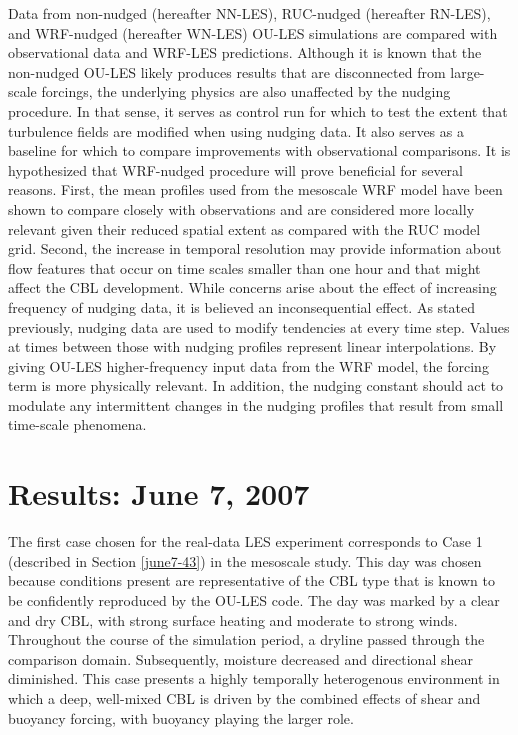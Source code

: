 Data from non-nudged (hereafter NN-LES), RUC-nudged (hereafter RN-LES), and WRF-nudged (hereafter WN-LES) OU-LES simulations are compared with observational data and WRF-LES predictions. Although it is known that the non-nudged OU-LES likely produces results that are disconnected from large-scale forcings, the underlying physics are also unaffected by the nudging procedure. In that sense, it serves as control run for which to test the extent that turbulence fields are modified when using nudging data. It also serves as a baseline for which to compare improvements with observational comparisons. It is hypothesized that WRF-nudged procedure will prove beneficial for several reasons. First, the mean profiles used from the mesoscale WRF model have been shown to compare closely with observations and are considered more locally relevant given their reduced spatial extent as compared with the RUC model grid. Second, the increase in temporal resolution may provide information about flow features that occur on time scales smaller than one hour and that might affect the CBL development. While concerns arise about the effect of increasing frequency of nudging data, it is believed an inconsequential effect. As stated previously, nudging data are used to modify tendencies at every time step. Values at times between those with nudging profiles represent linear interpolations. By giving OU-LES higher-frequency input data from the WRF model, the forcing term is more physically relevant. In addition, the nudging constant should act to modulate any intermittent changes in the nudging profiles that result from small time-scale phenomena.

\section{Results: June 7, 2007}
\label{res-62}

The first case chosen for the real-data LES experiment corresponds to Case 1 (described in Section \autoref{june7-43}) in the mesoscale study. This day was chosen because conditions present are representative of the CBL type that is known to be confidently reproduced by the OU-LES code. The day was marked by a clear and dry CBL, with strong surface heating and moderate to strong winds. Throughout the course of the simulation period, a dryline passed through the comparison domain. Subsequently, moisture decreased and directional shear diminished. This case presents a highly temporally heterogenous environment in which a deep, well-mixed CBL is driven by the combined effects of shear and buoyancy forcing, with buoyancy playing the larger role.

